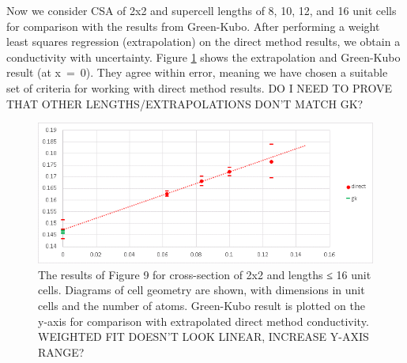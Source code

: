 \documentclass[%
preprint,                                  %
nofootinbib,
 amsmath,amssymb,
 aps,
]{revtex4-1}
\begin{document}
Now we consider CSA of 2x2 and supercell lengths of 8, 10, 12, and 16 unit cells for comparison with the results from Green-Kubo. After performing a weight least squares regression (extrapolation) on the direct method results, we obtain a conductivity with uncertainty. Figure \ref{fig:gk-direct} shows the extrapolation and Green-Kubo result (at x~=~0). They agree within error, meaning we have chosen a suitable set of criteria for working with direct method results. DO I NEED TO PROVE THAT OTHER LENGTHS/EXTRAPOLATIONS DON'T MATCH GK?

\begin{figure}[h!]
  \includegraphics[width=\linewidth]{images/gk-direct-2.png}
  \caption{The results of Figure 9 for cross-section of 2x2 and lengths ≤ 16 unit cells. Diagrams of cell geometry are shown, with dimensions in unit cells and the number of atoms. Green-Kubo result is plotted on the y-axis for comparison with extrapolated direct method conductivity. WEIGHTED FIT DOESN'T LOOK LINEAR, INCREASE Y-AXIS RANGE?}
  \label{fig:gk-direct}
\end{figure}




\end{document}
